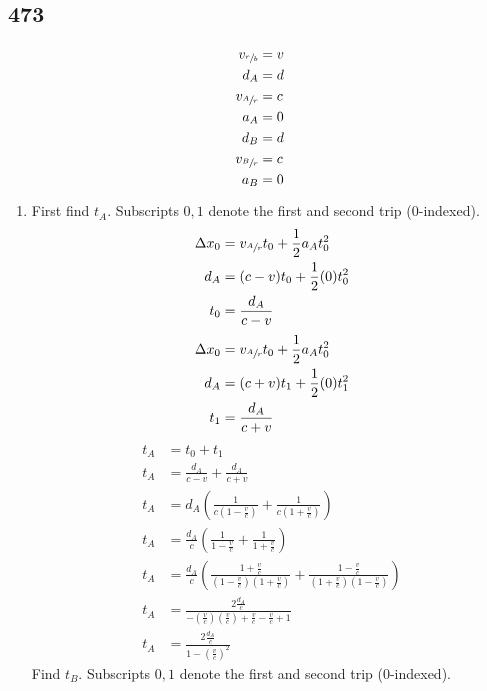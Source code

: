 \documentclass{article}
\begin{document}
\subsection{473}
\begin{align*}
	v_{\sfrac{r}{b}} & = v \\
	d_A & = d \\
	v_{\sfrac{A}{r}} & = c \\
	a_A & = 0 \\
	d_B & = d \\
	v_{\sfrac{B}{r}} & = c \\
	a_B & = 0
\end{align*}
\begin{enumerate}[label=\textbf{(\alph*)}]
	\item
		First find $ t_A $. Subscripts $ 0, 1 $ denote the first and second trip (0-indexed).
		\begin{align*}
			\Delta x_0 & = v_{\sfrac{A}{r}}t_0 + \frac{1}{2}a_At_0^2 \\
			d_A & = (c - v)t_0 + \frac{1}{2}(0)t_0^2 \\
			t_0 & = \frac{ d_A }{ c - v }
		\end{align*}
		\begin{align*}
			\Delta x_0 & = v_{\sfrac{A}{r}}t_0 + \frac{1}{2}a_At_0^2 \\
			d_A & = (c + v)t_1 + \frac{1}{2}(0)t_1^2 \\
			t_1 & = \frac{ d_A }{ c + v }
		\end{align*}
		\begin{align*}
			t_A & = t_0 + t_1 \\
			t_A & = \frac{d_A}{c - v} + \frac{d_A}{c + v} \\
			t_A & = d_A \left( \frac{ 1 }{ c \left( 1 - \frac{v}{c} \right) } + \frac{ 1 }{ c \left( 1 + \frac{v}{c} \right) } \right) \\
			t_A & = \frac{d_A}{c} \left( \frac{1}{1 - \frac{v}{c}} + \frac{1}{1 + \frac{v}{c}} \right) \\
			t_A & = \frac{d_A}{c} \left( \frac{1 + \frac{v}{c}}{(1 - \frac{v}{c})(1 + \frac{v}{c})} + \frac{1 - \frac{v}{c}}{(1 + \frac{v}{c})(1 - \frac{v}{c})} \right) \\
			t_A & = \frac{ 2\frac{d_A}{c} }{ -(\frac{v}{c})(\frac{v}{c}) + \frac{v}{c} - \frac{v}{c} + 1 } \\
			t_A & = \frac{ 2\frac{d_A}{c} }{ 1 - (\frac{v}{c})^2 }
		\end{align*}
		Find $ t_B $. Subscripts $ 0, 1 $ denote the first and second trip (0-indexed).

\end{enumerate}
\end{document}
